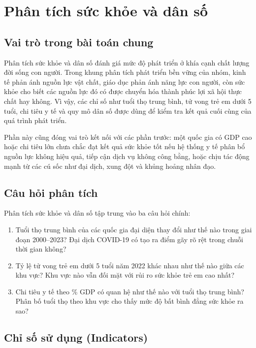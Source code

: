 \section{Phân tích sức khỏe và dân số}

\subsection{Vai trò trong bài toán chung}

Phân tích sức khỏe và dân số đánh giá mức độ phát triển ở khía cạnh chất lượng đời sống con người. Trong khung phân tích phát triển bền vững của nhóm, kinh tế phản ánh nguồn lực vật chất, giáo dục phản ánh năng lực con người, còn sức khỏe cho biết các nguồn lực đó có được chuyển hóa thành phúc lợi xã hội thực chất hay không. Vì vậy, các chỉ số như tuổi thọ trung bình, tử vong trẻ em dưới 5 tuổi, chi tiêu y tế và quy mô dân số được dùng để kiểm tra kết quả cuối cùng của quá trình phát triển.

Phần này cũng đóng vai trò kết nối với các phần trước: một quốc gia có GDP cao hoặc chi tiêu lớn chưa chắc đạt kết quả sức khỏe tốt nếu hệ thống y tế phân bổ nguồn lực không hiệu quả, tiếp cận dịch vụ không công bằng, hoặc chịu tác động mạnh từ các cú sốc như đại dịch, xung đột và khủng hoảng nhân đạo.

\subsection{Câu hỏi phân tích}

Phân tích sức khỏe và dân số tập trung vào ba câu hỏi chính:

\begin{enumerate}
    \item Tuổi thọ trung bình của các quốc gia đại diện thay đổi như thế nào trong giai đoạn 2000--2023? Đại dịch COVID-19 có tạo ra điểm gãy rõ rệt trong chuỗi thời gian không?
    \item Tỷ lệ tử vong trẻ em dưới 5 tuổi năm 2022 khác nhau như thế nào giữa các khu vực? Khu vực nào vẫn đối mặt với rủi ro sức khỏe trẻ em cao nhất?
    \item Chi tiêu y tế theo \% GDP có quan hệ như thế nào với tuổi thọ trung bình? Phân bố tuổi thọ theo khu vực cho thấy mức độ bất bình đẳng sức khỏe ra sao?
\end{enumerate}

\subsection{Chỉ số sử dụng (Indicators)}

